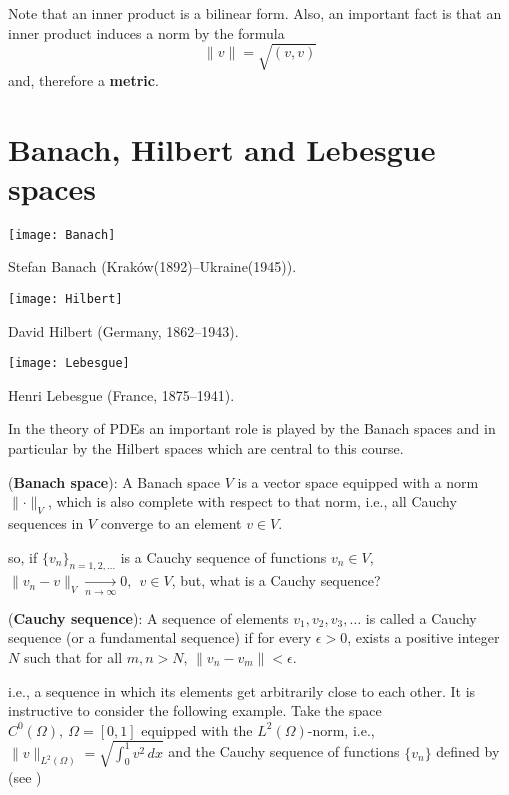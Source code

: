 Note that an inner product is a bilinear form. Also, an important
fact is that an inner product induces a norm by the formula
\begin{equation}
\lVert v \rVert = \sqrt{(v,v)}
\end{equation}
and, therefore a \textbf{metric}.

\section{Banach, Hilbert and Lebesgue spaces}

\begin{marginfigure}[-1.5cm]
       \texttt{[image: Banach]}
       \caption[]{Stefan Banach (Krak\'ow(1892)--Ukraine(1945)).} 
\end{marginfigure}
\begin{marginfigure}[3.5cm]
       \texttt{[image: Hilbert]}
       \caption[]{David Hilbert (Germany, 1862--1943).} 
\end{marginfigure}
\begin{marginfigure}[8.5cm]
       \texttt{[image: Lebesgue]}
       \caption[]{Henri Lebesgue (France, 1875--1941).} 
\end{marginfigure}

In the theory of PDEs an important role is played by
the Banach spaces and in particular by the Hilbert spaces
which are central to this course.
\begin{definition} 
(\textbf{Banach space}):
A Banach space $V$ is a vector space equipped with a
norm $\parallel \cdot \parallel_V$,
which is also complete with respect to that norm, i.e.,
all Cauchy sequences in $V$ converge to an element $v \in V$.
\end{definition}
so, if $\{v_n\}_{n=1,2,\dots}$ is a Cauchy sequence of functions $v_n \in V$,
$\lVert v_n - v \rVert_V \xrightarrow[n\rightarrow \infty]{}0,~~v \in V$,
but, what is a Cauchy sequence?
\begin{definition} 
(\textbf{Cauchy sequence}): A sequence of elements $v_1, v_2, v_3, \dots$
is called a Cauchy sequence (or a fundamental sequence)
if for every $\epsilon > 0$,
exists a positive integer $N$ such that for all $m,n > N$,
$\parallel v_n - v_m \parallel < \epsilon$.
\end{definition}
i.e., a sequence in which its elements get arbitrarily close
to each other. It is instructive to consider the following example.
Take the space $C^0(\Omega),~\Omega = [0,1]$ equipped with the $L^2(\Omega)$-norm, i.e.,
$\lVert v \rVert_{L^2(\Omega)} = \sqrt{\int_0^1{v^2}\,dx}$ and the Cauchy
sequence of functions $\{v_n\}$ defined by (see )

